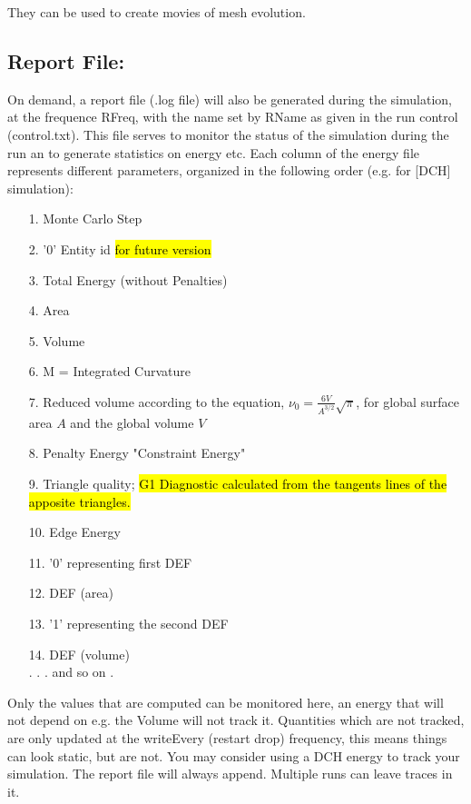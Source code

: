 \documentclass[11pt]{article}
\begin{document}
They can be used to create movies of mesh evolution.

\subsection{Report File: } 
On demand, a report file (.log file) will also be generated during the simulation, at the frequence RFreq, with the name set by RName as given in the run control (control.txt). This file serves to monitor the status of the simulation during the run an to generate statistics on energy etc. Each column of the energy file represents different parameters, organized in the following order (e.g. for [DCH] simulation):

\begin{itemize}
    \item[1.] Monte Carlo Step
    \item[2.] '0' Entity id \hl{for future version}
    \item[3.] Total Energy (without Penalties)
    \item[4.] Area
    \item[5.] Volume
    \item[6.] M = Integrated Curvature
    \item[7.] Reduced volume according to the equation,  $
 \nu_0 = \frac{6V}{A^{3/2}}\sqrt{\pi}
$, for global surface area $A$ and the global volume $V$
    \item[8.] Penalty Energy "Constraint Energy"
    \item[9.] Triangle quality; \hl{G1 Diagnostic calculated from the tangents lines of the apposite triangles.}
    \item[10.] Edge Energy 
    \item[11.] '0' representing first DEF 
    \item[12.] DEF (area)
    \item[13.]  '1' representing the second DEF
    \item[14.] DEF (volume) \\
    . . . and so on .   
\end{itemize}

\begin{tcolorbox}[colback=orange!5!white,colframe=orange!75!black,title=Clarification]
Only the values that are computed can be monitored here, an energy that will not depend on e.g. the Volume will not track it. Quantities which are not tracked, are only updated at the writeEvery (restart drop) frequency, this means things can look static, but are not. You may consider using a DCH energy to track your simulation.
The report file will always append. Multiple runs can leave traces in it.
\end{tcolorbox}
\noindent
\end{document}
